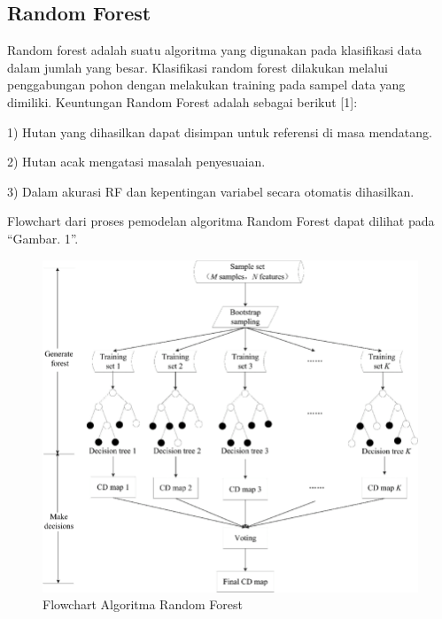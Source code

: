 \documentclass[conference]{IEEEtran}
\begin{document}
\subsection{Random Forest}\label{AA}
Random forest adalah suatu algoritma yang digunakan pada klasifikasi data dalam jumlah yang besar. Klasifikasi random forest dilakukan melalui penggabungan pohon dengan melakukan training pada sampel data yang dimiliki.
Keuntungan Random Forest adalah sebagai berikut [1]:

1) Hutan yang dihasilkan dapat disimpan untuk referensi
di masa mendatang.

2) Hutan acak mengatasi masalah penyesuaian.

3) Dalam akurasi RF dan kepentingan variabel secara
otomatis dihasilkan.

Flowchart dari proses pemodelan algoritma Random Forest
dapat dilihat pada “Gambar. 1”.

\begin{figure}
\centering
\includegraphics[width=.4\textwidth]{Gambar/gambar1.png}
\caption{Flowchart Algoritma Random Forest}
\end{figure}
\end{document}
